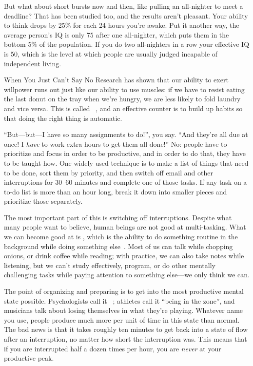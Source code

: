 But what about short bursts now and then,
like pulling an all-nighter to meet a deadline?
That has been studied too,
and the results aren't pleasant.
Your ability to think drops by 25\% for each 24 hours you're awake.
Put it another way,
the average person's IQ is only 75 after one all-nighter,
which puts them in the bottom 5\% of the population.
If you do two all-nighters in a row your effective IQ is 50,
which is the level at which people are usually judged incapable of independent living.

\begin{aside}{When You Just Can't Say No}
  Research has shown that our ability to exert willpower runs out
  just like our ability to use muscles:
  if we have to resist eating the last donut on the tray when we're hungry,
  we are less likely to fold laundry and vice versa.
  This is called ~\cite{Mill2016a},
  and an effective counter is to build up habits
  so that doing the right thing is automatic.
\end{aside}

``But---but---I have so many assignments to do!'', you say.
``And they're all due at once!
I \emph{have} to work extra hours to get them all done!''
No:
people have to prioritize and focus in order to be productive,
and in order to do that,
they have to be taught how.
One widely-used technique is to make a list of things that need to be done,
sort them by priority,
and then switch off email and other interruptions for 30--60 minutes
and complete one of those tasks.
If any task on a to-do list is more than an hour long,
break it down into smaller pieces and prioritize those separately.

The most important part of this is switching off interruptions.
Despite what many people want to believe,
human beings are not good at multi-tasking.
What we can become good at is ,
which is the ability to do something routine in the background
while doing something else~\cite{Mill2016a}.
Most of us can talk while chopping onions,
or drink coffee while reading;
with practice,
we can also take notes while listening,
but we can't study effectively,
program,
or do other mentally challenging tasks while paying attention to something else---we
only think we can.

The point of organizing and preparing is
to get into the most productive mental state possible.
Psychologists call it ~\cite{Csik2008};
athletes call it ``being in the zone'',
and musicians talk about losing themselves in what they're playing.
Whatever name you use,
people produce much more per unit of time in this state than normal.
The bad news is that
it takes roughly ten minutes to get back into a state of flow after an interruption,
no matter how short the interruption was.
This means that if you are interrupted half a dozen times per hour,
you are \emph{never} at your productive peak.

